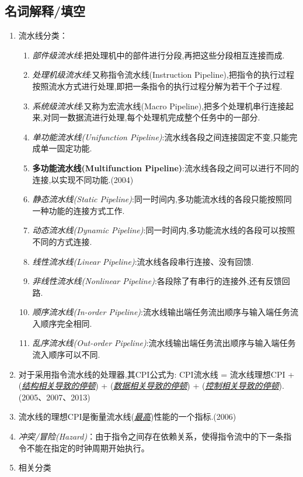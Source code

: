 \documentclass[a4paper]{ctexart}
\begin{document}
\subsection{名词解释/填空}
\begin{enumerate}
  \item 流水线分类：
  \begin{enumerate}
    \item \emph{部件级流水线}:把处理机中的部件进行分段,再把这些分段相互连接而成.
    \item \emph{处理机级流水线}:又称指令流水线(Instruction Pipeline),把指令的执行过程按照流水方式进行处理,即把一条指令的执行过程分解为若干个子过程.
    \item \emph{系统级流水线}:又称为宏流水线(Macro Pipeline),把多个处理机串行连接起来,对同一数据流进行处理,每个处理机完成整个任务中的一部分.
    \item \emph{单功能流水线(Unifunction Pipeline)}:流水线各段之间连接固定不变,只能完成单一固定功能.
    \item \textbf{多功能流水线(Multifunction Pipeline)}:流水线各段之间可以进行不同的连接,以实现不同功能.(2004)
    \item \emph{静态流水线(Static Pipeline)}:同一时间内,多功能流水线的各段只能按照同一种功能的连接方式工作.
    \item \emph{动态流水线(Dynamic Pipeline)}:同一时间内,多功能流水线的各段可以按照不同的方式连接.
    \item \emph{线性流水线(Linear Pipeline)}:流水线各段串行连接、没有回馈.
    \item \emph{非线性流水线(Nonlinear Pipeline)}:各段除了有串行的连接外,还有反馈回路.
    \item \emph{顺序流水线(In-order Pipeline)}:流水线输出端任务流出顺序与输入端任务流入顺序完全相同.
    \item \emph{乱序流水线(Out-order Pipeline)}:流水线输出端任务流出顺序与输入端任务流入顺序可以不同.
  \end{enumerate}
  \item 对于采用指令流水线的处理器,其CPI公式为: CPI流水线 = 流水线理想CPI + (\emph{\underline{结构相关导致的停顿}}) + (\emph{\underline{数据相关导致的停顿}}) + (\emph{\underline{控制相关导致的停顿}}).(2005、2007、2013)
  \item 流水线的理想CPI是衡量流水线(\emph{\underline{最高}})性能的一个指标.(2006)
  \item \emph{冲突/冒险(Hazard)}：由于指令之间存在依赖关系，使得指令流中的下一条指令不能在指定的时钟周期开始执行。
  \item 相关分类

\end{enumerate}
\end{document}
